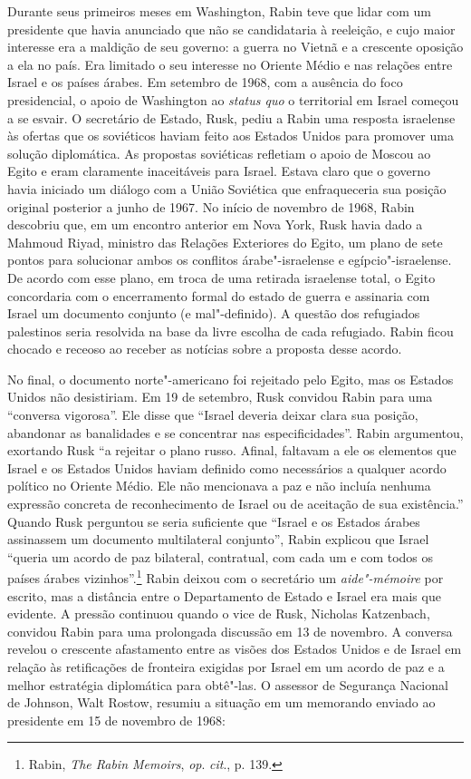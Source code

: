 Durante seus primeiros meses em Washington, Rabin teve que lidar com um
presidente que havia anunciado que não se candidataria à reeleição, e
cujo maior interesse era a maldição de seu governo: a guerra no Vietnã e
a crescente oposição a ela no país. Era limitado o seu interesse no
Oriente Médio e nas relações entre Israel e os países árabes. Em
setembro de 1968, com a ausência do foco presidencial, o apoio de
Washington ao \emph{status quo} o territorial em Israel começou a se
esvair. O secretário de Estado, Rusk, pediu a Rabin uma resposta
israelense às ofertas que os soviéticos haviam feito aos Estados Unidos para
promover uma solução diplomática. As propostas soviéticas refletiam o
apoio de Moscou ao Egito e eram claramente inaceitáveis para Israel.
Estava claro que o governo havia iniciado um diálogo com a União
Soviética que enfraqueceria sua posição original posterior a junho de
1967. No início de novembro de 1968, Rabin descobriu que, em um encontro
anterior em Nova York, Rusk havia dado a Mahmoud Riyad, ministro das
Relações Exteriores do Egito, um plano de sete pontos para solucionar
ambos os conflitos árabe"-israelense e egípcio"-israelense. De acordo com esse
plano, em troca de uma retirada israelense total, o Egito concordaria
com o encerramento formal do estado de guerra e assinaria com Israel um
documento conjunto (e mal"-definido). A questão dos refugiados palestinos
seria resolvida na base da livre escolha de cada refugiado. Rabin ficou
chocado e receoso ao receber as notícias sobre a proposta desse acordo.

No final, o documento norte"-americano foi rejeitado pelo Egito, mas os
Estados Unidos não desistiriam. Em 19 de setembro, Rusk convidou Rabin para uma
``conversa vigorosa''. Ele disse que ``Israel deveria deixar clara sua
posição, abandonar as banalidades e se concentrar nas especificidades''. Rabin
argumentou, exortando Rusk ``a rejeitar o plano russo. Afinal, faltavam
a ele os elementos que Israel e os Estados Unidos haviam definido como necessários
a qualquer acordo político no Oriente Médio. Ele não mencionava a paz e
não incluía nenhuma expressão concreta de reconhecimento de Israel ou de
aceitação de sua existência.'' Quando Rusk perguntou se seria suficiente
que ``Israel e os Estados árabes assinassem um documento multilateral
conjunto'', Rabin explicou que Israel ``queria um acordo de paz
bilateral, contratual, com cada um e com todos os países árabes
vizinhos''.\footnote{Rabin, \emph{The Rabin Memoirs}, \emph{op}. \emph{cit}., p. 139.} 
Rabin deixou com o secretário um
\emph{aide"-mémoire} por escrito, mas a distância entre o Departamento de
Estado e Israel era mais que evidente. A pressão continuou quando o vice
de Rusk, Nicholas Katzenbach, convidou Rabin para uma prolongada
discussão em 13 de novembro. A conversa revelou o crescente afastamento
entre as visões dos Estados Unidos e de Israel em relação às retificações de
fronteira exigidas por Israel em um acordo de paz e a melhor estratégia
diplomática para obtê"-las. O assessor de Segurança Nacional de Johnson,
Walt Rostow, resumiu a situação em um memorando enviado ao presidente em
15 de novembro de 1968: 

